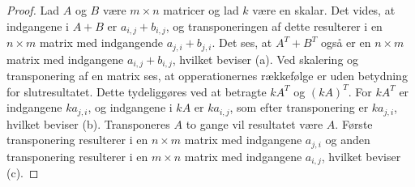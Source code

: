 %
\begin{proof}
Lad $A$ og $B$ være $m \times n$ matricer og lad $k$ være en skalar.
Det vides, at indgangene i $A+B$ er $a_{i,j} + b_{i,j}$, og transponeringen af dette resulterer i en $n \times m$ matrix med indgangende $a_{j,i} + b_{j,i}$.
Det ses, at  $A^T + B^T$ også er en $n \times m$ matrix med indgangene $a_{i,j} + b_{i,j}$, hvilket beviser (a).
Ved skalering og transponering af en matrix ses, at opperationernes rækkefølge er uden betydning for slutresultatet.
Dette tydeliggøres ved at betragte $kA^T$ og $(kA)^T$.
For $kA^T$ er indgangene $ka_{j,i}$, og indgangene i $kA$ er $ka_{i,j}$, som efter transponering er $ka_{j,i}$, hvilket beviser (b).
Transponeres $A$ to gange vil resultatet være $A$.
Første transponering resulterer i en $n \times m$ matrix med indgangene $a_{j,i}$ og anden transponering resulterer i en $m \times n$ matrix med indgangene $a_{i,j}$, hvilket beviser (c).
\end{proof}